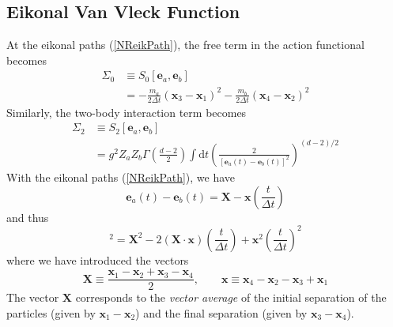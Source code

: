 \subsection{Eikonal Van Vleck Function}
At the eikonal paths (\ref{NReikPath}), the free term in the action functional becomes
\begin{align}
	\Sigma_{0} &\equiv S_{0}\left[ \mathbf{e}_{a}, \mathbf{e}_{b} \right] \nonumber \\
	&= -\frac{m_{a}}{2 \Delta t} \left( \mathbf{x}_{3} - \mathbf{x}_{1} \right)^{2} - \frac{m_{b}}{2 \Delta t} \left( \mathbf{x}_{4} - \mathbf{x}_{2} \right)^{2} \label{Sigma0NR}
\end{align}
Similarly, the two-body interaction term becomes
\begin{align}
	\Sigma_{2} &\equiv S_{2}\left[ \mathbf{e}_{a}, \mathbf{e}_{b} \right] \nonumber \\
	&= g^{2} Z_{a} Z_{b} \Gamma\left( \frac{d - 2}{2} \right) \int \mathrm{d}t \left( \frac{2}{[\mathbf{e}_{a}(t) - \mathbf{e}_{b}(t)]^{2}} \right)^{(d - 2)/2} \label{Sigma2NR}
\end{align}
With the eikonal paths (\ref{NReikPath}), we have
\begin{equation}
	\mathbf{e}_{a}(t) - \mathbf{e}_{b}(t) = \mathbf{X} - \mathbf{x} \left( \frac{t}{\Delta t} \right)
\end{equation}
and thus
\begin{equation}
	[\mathbf{e}_{a}(t) - \mathbf{e}_{b}(t)]^{2} = \mathbf{X}^{2} - 2 (\mathbf{X} \cdot \mathbf{x}) \left( \frac{t}{\Delta t} \right) + \mathbf{x}^{2} \left( \frac{t}{\Delta t} \right)^{2}
\end{equation}
where we have introduced the vectors
\begin{equation}
	\mathbf{X} \equiv \frac{\mathbf{x}_{1} - \mathbf{x}_{2} + \mathbf{x}_{3} - \mathbf{x}_{4}}{2} , \qquad \mathbf{x} \equiv \mathbf{x}_{4} - \mathbf{x}_{2} - \mathbf{x}_{3} + \mathbf{x}_{1}
\end{equation}
The vector $\mathbf{X}$ corresponds to the \textit{vector average} of the initial separation of the particles (given by $\mathbf{x}_{1} - \mathbf{x}_{2}$) and the final separation (given by $\mathbf{x}_{3} - \mathbf{x}_{4}$).

